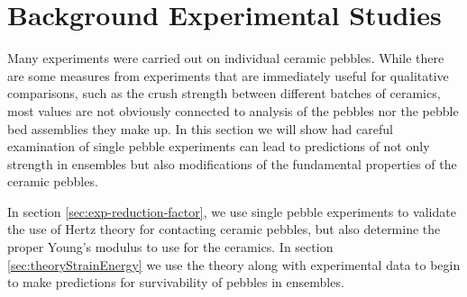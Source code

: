 \chapter{Background Experimental Studies}\label{sec:studies-experiments}

Many experiments were carried out on individual ceramic pebbles. While there are some measures from experiments that are immediately useful for qualitative comparisons, such as the crush strength between different batches of ceramics, most values are not obviously connected to analysis of the pebbles nor the pebble bed assemblies they make up. In this section we will show had careful examination of single pebble experiments can lead to predictions of not only strength in ensembles but also modifications of the fundamental properties of the ceramic pebbles.

In section \cref{sec:exp-reduction-factor}, we use single pebble experiments to validate the use of Hertz theory for contacting ceramic pebbles, but also determine the proper Young's modulus to use for the ceramics. In section \cref{sec:theoryStrainEnergy} we use the theory along with experimental data to begin to make predictions for survivability of pebbles in ensembles.






